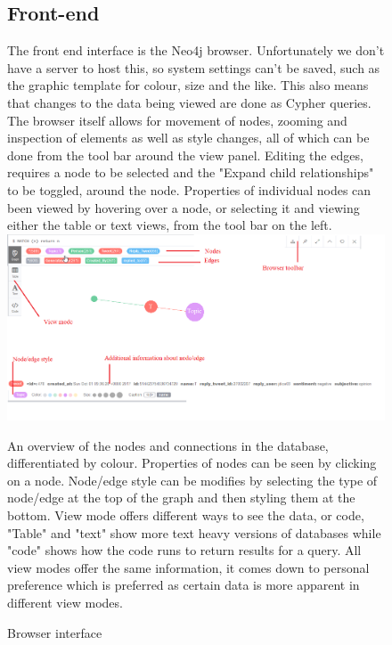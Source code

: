 \documentclass[11pt]{article}
\begin{document}
\begin{figure}
\subsection{Front-end}
The front end interface is the Neo4j browser. Unfortunately we don't have a server to host this, so system settings can't be saved, such as the graphic template for colour, size and the like. This also means that changes to the data being viewed are done as Cypher queries. The browser itself allows for movement of nodes, zooming and inspection of elements as well as style changes, all of which can be done from the tool bar around the view panel. Editing the edges, requires a node to be selected and the "Expand child relationships" to be toggled, around the node. Properties of individual nodes can been viewed by hovering over a node, or selecting it and viewing either the table or text views, from the tool bar on the left.\newline
\newline
\includegraphics[width=\textwidth]{User}
\caption{Browser interface} 
\label{fig: 5}
An overview of the nodes and connections in the database, differentiated by colour. Properties of nodes can be seen by clicking on a node. Node/edge style can be modifies by selecting the type of node/edge at the top of the graph and then styling them at the bottom.\newline
View mode offers different ways to see the data, or code, "Table" and "text" show more text heavy versions of databases while "code" shows how the code runs to return results for a query. All view modes offer the same information, it comes down to personal preference which is preferred as certain data is more apparent in different view modes.\newline

\end{figure}
\end{document}
